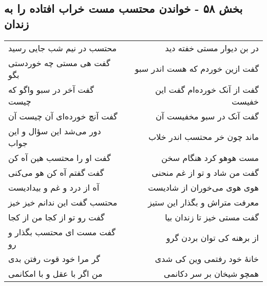 \begin{center}
\section*{بخش ۵۸ - خواندن محتسب مست خراب افتاده را به زندان}
\label{sec:sh058}
\begin{longtable}{l p{0.5cm} r}
محتسب در نیم شب جایی رسید
&&
در بن دیوار مستی خفته دید
\\
گفت هی مستی چه خوردستی بگو
&&
گفت ازین خوردم که هست اندر سبو
\\
گفت آخر در سبو واگو که چیست
&&
گفت از آنک خورده‌ام گفت این خفیست
\\
گفت آنچ خورده‌ای آن چیست آن
&&
گفت آنک در سبو مخفیست آن
\\
دور می‌شد این سؤال و این جواب
&&
ماند چون خر محتسب اندر خلاب
\\
گفت او را محتسب هین آه کن
&&
مست هوهو کرد هنگام سخن
\\
گفت گفتم آه کن هو می‌کنی
&&
گفت من شاد و تو از غم منحنی
\\
آه از درد و غم و بیدادیست
&&
هوی هوی می‌خوران از شادیست
\\
محتسب گفت این ندانم خیز خیز
&&
معرفت متراش و بگذار این ستیز
\\
گفت رو تو از کجا من از کجا
&&
گفت مستی خیز تا زندان بیا
\\
گفت مست ای محتسب بگذار و رو
&&
از برهنه کی توان بردن گرو
\\
گر مرا خود قوت رفتن بدی
&&
خانهٔ خود رفتمی وین کی شدی
\\
من اگر با عقل و با امکانمی
&&
همچو شیخان بر سر دکانمی
\\
\end{longtable}
\end{center}

